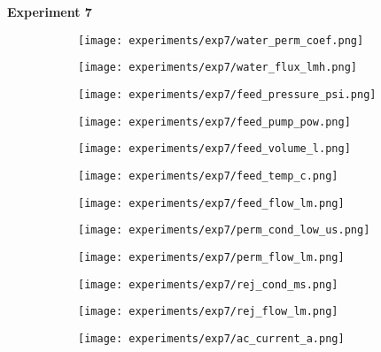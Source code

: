 \documentclass{article}
\begin{document}
    \pagebreak
    
    \textbf{Experiment 7}
    \begin{figure}[H]
        \centering
        \begin{subfigure}{0.48\linewidth}
		    \texttt{[image: experiments/exp7/water\_perm\_coef.png]}
	    \end{subfigure}
	    \begin{subfigure}{0.48\linewidth}
		    \texttt{[image: experiments/exp7/water\_flux\_lmh.png]}
	    \end{subfigure}
	    \begin{subfigure}{0.48\linewidth}
		    \texttt{[image: experiments/exp7/feed\_pressure\_psi.png]}
	    \end{subfigure}
	    \begin{subfigure}{0.48\linewidth}
		    \texttt{[image: experiments/exp7/feed\_pump\_pow.png]}
	    \end{subfigure}
	    \begin{subfigure}{0.48\linewidth}
		    \texttt{[image: experiments/exp7/feed\_volume\_l.png]}
	    \end{subfigure}
	    \begin{subfigure}{0.48\linewidth}
		    \texttt{[image: experiments/exp7/feed\_temp\_c.png]}
	    \end{subfigure}
	    \begin{subfigure}{0.48\linewidth}
		    \texttt{[image: experiments/exp7/feed\_flow\_lm.png]}
	    \end{subfigure}
	    \begin{subfigure}{0.48\linewidth}
		    \texttt{[image: experiments/exp7/perm\_cond\_low\_us.png]}
	    \end{subfigure}
	    \begin{subfigure}{0.48\linewidth}
		    \texttt{[image: experiments/exp7/perm\_flow\_lm.png]}
	    \end{subfigure}
	    \begin{subfigure}{0.48\linewidth}
		    \texttt{[image: experiments/exp7/rej\_cond\_ms.png]}
	    \end{subfigure}
	    \begin{subfigure}{0.48\linewidth}
		    \texttt{[image: experiments/exp7/rej\_flow\_lm.png]}
	    \end{subfigure}
	    \begin{subfigure}{0.48\linewidth}
		    \texttt{[image: experiments/exp7/ac\_current\_a.png]}
	    \end{subfigure}
    \end{figure}
    
\end{document}
